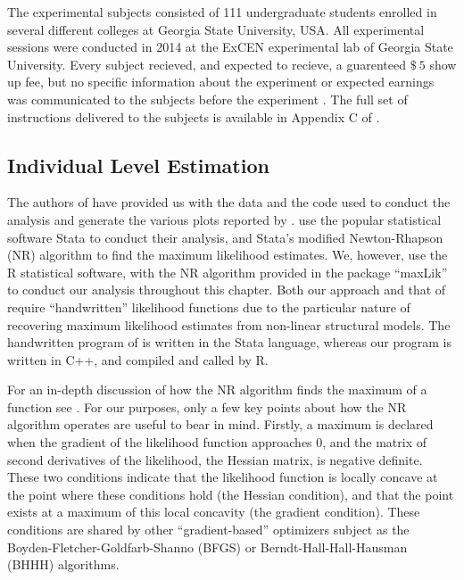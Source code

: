 \documentclass[11pt,a4paper]{report}
\newcommand{\money}[1]{$\$\!\:#1$}          %
\begin{document}
The experimental subjects consisted of 111 undergraduate students enrolled in several different colleges at Georgia State University, USA.
All experimental sessions were conducted in 2014 at the ExCEN experimental lab of Georgia State University. 
Every subject recieved, and expected to recieve, a guarenteed \money{5} show up fee, but no specific information about the experiment or expected earnings was communicated to the subjects before the experiment \parencite[98]{Harrison2016}.
The full set of instructions delivered to the subjects is available in Appendix C of \textcite{Harrison2016}.

\subsection{Individual Level Estimation}

The authors of \textcite{Harrison2016} have provided us with the data and the code used to conduct the analysis and generate the various plots reported by \textcite{Harrison2016}.
\textcite{Harrison2016} use the popular statistical software Stata to conduct their analysis, and Stata's modified Newton-Rhapson (NR) algorithm to find the maximum likelihood estimates.
We, however, use the R statistical software, with the NR algorithm provided in the package \enquote{maxLik} to conduct our analysis throughout this chapter.
Both our approach and that of \textcite{Harrison2016} require \enquote{handwritten} likelihood functions due to the particular nature of recovering maximum likelihood estimates from non-linear structural models.
The handwritten program of \textcite{Harrison2016} is written in the Stata language, whereas our program is written in C++, and compiled and called by R.

For an in-depth discussion of how the NR algorithm finds the maximum of a function see \textcite[213-219]{Train2002}.
For our purposes, only a few key points about how the NR algorithm operates are useful to bear in mind.
Firstly, a maximum is declared when the gradient of the likelihood function approaches 0, and the matrix of second derivatives of the likelihood, the Hessian matrix, is negative definite.
These two conditions indicate that the likelihood function is locally concave at the point where these conditions hold (the Hessian condition), and that the point exists at a maximum of this local concavity (the gradient condition).
These conditions are shared by other \enquote{gradient-based} optimizers subject as the Boyden-Fletcher-Goldfarb-Shanno (BFGS) or Berndt-Hall-Hall-Hausman (BHHH) algorithms.
\end{document}
